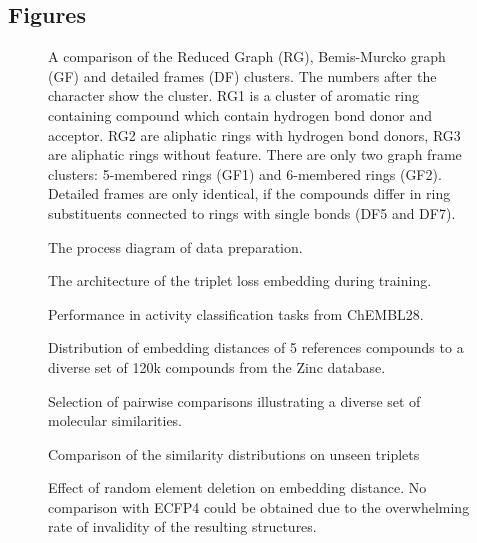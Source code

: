\documentclass[doublespacing]{bmcart}
\begin{document}
\begin{backmatter}


\section*{Figures}

\begin{figure}[h!]
\caption{A comparison of the Reduced Graph (RG), Bemis-Murcko graph (GF) and detailed frames (DF) clusters. The numbers after the character show the cluster. RG1 is a cluster of aromatic ring containing compound which contain hydrogen bond donor and acceptor. RG2 are aliphatic rings with hydrogen bond donors, RG3 are aliphatic rings without feature. There are only two graph frame clusters: 5-membered rings (GF1) and 6-membered rings (GF2). Detailed frames are only identical, if the compounds differ in ring substituents connected to rings with single bonds (DF5 and DF7).}
\label{fig:GF_DF_RG}
\end{figure}

\begin{figure}[h!]
\caption{The process diagram of data preparation.}
\label{fig:Process_Diagram}
\end{figure}

\begin{figure}[h!]
\caption{The architecture of the triplet loss embedding during training.}
\label{fig:triplet_arch}
\end{figure}
%
\begin{figure}[h!]
\caption{Performance in activity classification tasks from ChEMBL28.}
\label{fig:Kappa_ChEMBL}
\end{figure}

\begin{figure}[h!]
\caption{Distribution of embedding distances of 5 references compounds to a diverse set of 120k compounds from the Zinc database.}
\label{fig:References_distributions}
\end{figure}


\begin{figure}[h!]
\caption{Selection of pairwise comparisons illustrating a diverse set of molecular similarities.}
\label{fig:Similarity_study_cases}
\end{figure}
%
\begin{figure}[h!]
\caption{Comparison of the similarity distributions on unseen triplets}
\label{fig:ECFP4_Embedding_triplets}
\end{figure}

\begin{figure}[h!]
\caption{Effect of random element deletion on embedding distance. No comparison with ECFP4 could be obtained due to the overwhelming rate of invalidity of the resulting structures.}
\label{fig:Ablations}
\end{figure}

\end{backmatter}
\end{document}

